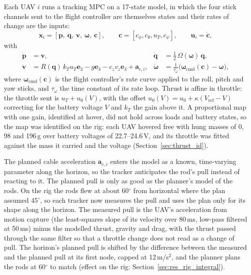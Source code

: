Each UAV $i$ runs a tracking MPC on a 17-state model, in which the four stick channels sent to the
flight controller are themselves states and their rates of change are the inputs:
\begin{equation}
    \mathbf{x}_i = [\mathbf{p},\ \mathbf{q},\ \mathbf{v},\ \boldsymbol{\omega},\ \mathbf{c}], \qquad
    \mathbf{c} = [c_\phi, c_\theta, u_T, c_\psi], \qquad \mathbf{u}_i = \dot{\mathbf{c}},
\end{equation}
with
\begin{align}
    \dot{\mathbf{p}} &= \mathbf{v}, &
    \dot{\mathbf{q}} &= \tfrac{1}{2}\, \Omega(\boldsymbol{\omega})\, \mathbf{q}, \\
    \dot{\mathbf{v}} &= R(\mathbf{q})\, k_T u_T \mathbf{e}_3 - g\mathbf{e}_3 - c_z v_z \mathbf{e}_3 + \mathbf{a}_{c,i}, &
    \dot{\boldsymbol{\omega}} &= \frac{1}{\tau_\omega}\big(\boldsymbol{\omega}_{\mathrm{cmd}}(\mathbf{c}) - \boldsymbol{\omega}\big),
    \label{eq:trk_model}
\end{align}
where $\boldsymbol{\omega}_{\mathrm{cmd}}(\mathbf{c})$ is the flight controller's rate curve applied to the
roll, pitch and yaw sticks, and $\tau_\omega$ the time constant of its rate loop. Thrust is affine in
throttle: the throttle sent is $u_T + u_0(V)$, with the offset $u_0(V) = u_0 + \kappa (V_{\mathrm{ref}} - V)$
correcting for the battery voltage $V$ and $k_T$ the gain above it. A proportional map with one gain,
identified at hover, did not hold across loads and battery states, so the map was identified on the
rig: each UAV hovered free with hung masses of 0, 98 and 196\,g over battery voltages of 22.7--24.6\,V,
and its throttle was fitted against the mass it carried and the voltage (Section~\ref{sec:thrust_id}).

The planned cable acceleration $\mathbf{a}_{c,i}$ enters the model as a known, time-varying parameter
along the horizon, so the tracker anticipates the rod's pull instead of reacting to it. The planned pull
is only as good as the planner's model of the rods. On the rig the rods flew at about 60$^\circ$ from
horizontal where the plan assumed 45$^\circ$, so each tracker now measures the pull and uses the plan only
for its shape along the horizon. The measured pull is the UAV's acceleration from motion capture (the
least-squares slope of its velocity over 80\,ms, low-pass filtered at 50\,ms) minus the modelled thrust,
gravity and drag, with the thrust passed through the same filter so that a throttle change does not read
as a change of pull. The horizon's planned pull is shifted by the difference between the measured and the
planned pull at its first node, capped at 12\,m/s$^2$, and the planner plans the rods at 60$^\circ$ to
match (effect on the rig: Section~\ref{sec:res_rig_integral}).

